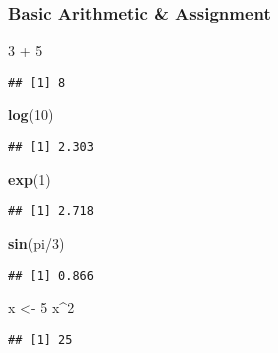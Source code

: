 \documentclass[ignorenonframetext,]{beamer}
\newenvironment{Shaded}{}{}
\newcommand{\KeywordTok}[1]{\textcolor[rgb]{0.00,0.44,0.13}{\textbf{{#1}}}}
\newcommand{\DecValTok}[1]{\textcolor[rgb]{0.25,0.63,0.44}{{#1}}}
\newcommand{\NormalTok}[1]{{#1}}
\begin{document}
\begin{frame}[fragile]\frametitle{Basic Arithmetic \& Assignment}

\begin{Shaded}
\begin{Highlighting}[]
\DecValTok{3} \NormalTok{+ }\DecValTok{5}
\end{Highlighting}
\end{Shaded}

\begin{verbatim}
## [1] 8
\end{verbatim}

\begin{Shaded}
\begin{Highlighting}[]
\KeywordTok{log}\NormalTok{(}\DecValTok{10}\NormalTok{)}
\end{Highlighting}
\end{Shaded}

\begin{verbatim}
## [1] 2.303
\end{verbatim}

\begin{Shaded}
\begin{Highlighting}[]
\KeywordTok{exp}\NormalTok{(}\DecValTok{1}\NormalTok{)}
\end{Highlighting}
\end{Shaded}

\begin{verbatim}
## [1] 2.718
\end{verbatim}

\begin{Shaded}
\begin{Highlighting}[]
\KeywordTok{sin}\NormalTok{(pi/}\DecValTok{3}\NormalTok{)}
\end{Highlighting}
\end{Shaded}

\begin{verbatim}
## [1] 0.866
\end{verbatim}

\begin{Shaded}
\begin{Highlighting}[]
\NormalTok{x <- }\DecValTok{5}
\NormalTok{x^}\DecValTok{2}
\end{Highlighting}
\end{Shaded}

\begin{verbatim}
## [1] 25
\end{verbatim}

\end{frame}
\end{document}
